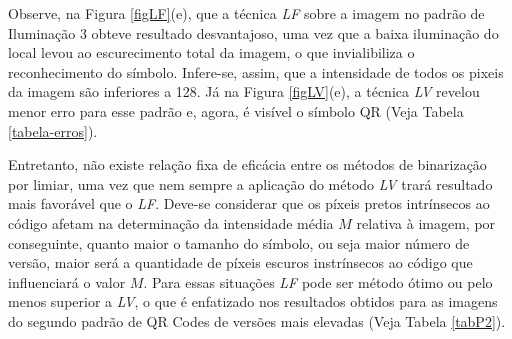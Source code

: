 \documentclass{ceel}
\begin{document}
\begin{multicols}{2}
\vspace{0.25cm}
Observe, na Figura \ref{figLF}(e), que a técnica \emph{LF} sobre a imagem no padrão de Iluminação 3 obteve resultado desvantajoso, uma vez que a baixa iluminação do local levou ao escurecimento total da imagem, o que invialibiliza o reconhecimento do símbolo. Infere-se, assim, que a intensidade de todos os pixeis da imagem são inferiores a 128. Já na Figura \ref{figLV}(e), a técnica \emph{LV} revelou menor erro para esse padrão e, agora, é visível o símbolo QR (Veja Tabela \ref{tabela-erros}). 

Entretanto, não existe relação fixa de eficácia entre os métodos de binarização por limiar, uma vez que nem sempre a aplicação do método \emph{LV} trará resultado mais favorável que o \emph{LF}. Deve-se considerar que os píxeis pretos intrínsecos ao código afetam na determinação da intensidade média $M$ relativa à imagem, por conseguinte, quanto maior o tamanho do símbolo, ou seja maior número de versão, maior será a quantidade de píxeis escuros instrínsecos ao código que influenciará o valor $M$. Para essas situações \emph{LF} pode ser método ótimo ou pelo menos superior a \emph{LV}, o que é enfatizado nos resultados obtidos para as imagens do segundo padrão de QR Codes de versões mais elevadas (Veja Tabela \ref{tabP2}).


\end{multicols}
\end{document}

